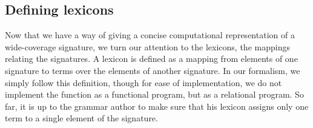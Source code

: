 \subsection{Defining lexicons}

Now that we have a way of giving a concise computational
representation of a wide-coverage signature, we turn our attention to
the lexicons, the mappings relating the signatures. A lexicon is
defined as a mapping from elements of one signature to terms over the
elements of another signature. In our formalism, we simply follow this
definition, though for ease of implementation, we do not implement the
function as a functional program, but as a relational program. So far,
it is up to the grammar author to make sure that his lexicon assigns
only one term to a single element of the signature.
